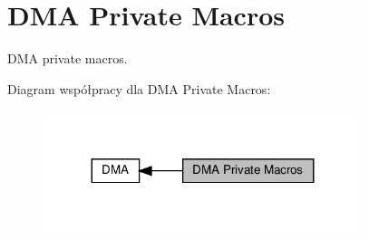 \hypertarget{group___d_m_a___private___macros}{}\section{D\+MA Private Macros}
\label{group___d_m_a___private___macros}


D\+MA private macros.  


Diagram współpracy dla D\+MA Private Macros\+:\nopagebreak
\begin{figure}[H]
\begin{center}
\leavevmode
\includegraphics[width=263pt]{group___d_m_a___private___macros}
\end{center}
\end{figure}
